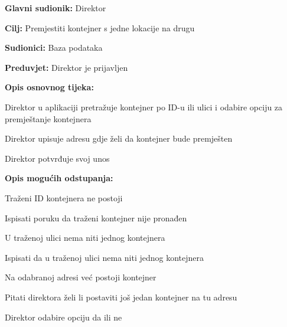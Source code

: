 			\noindent {}
			\begin{packed_item}
				
				\item \textbf{Glavni sudionik: } Direktor
				\item  \textbf{Cilj:} Premjestiti kontejner s jedne lokacije na drugu
				\item  \textbf{Sudionici:} Baza podataka
				\item  \textbf{Preduvjet:} Direktor je prijavljen
				\item  \textbf{Opis osnovnog tijeka:}
				
				\item[] \begin{packed_enum}
					
					\item Direktor u aplikaciji pretražuje kontejner po ID-u ili ulici i odabire opciju za premještanje kontejnera
					\item Direktor upisuje adresu gdje želi da kontejner bude premješten
					\item Direktor potvrđuje svoj unos
				\end{packed_enum}
				
				\item  \textbf{Opis mogućih odstupanja:}
				
				\item[] \begin{packed_item}
					
					\item[2.a] Traženi ID kontejnera ne postoji
					\item[] \begin{packed_enum}
						
						\item Ispisati poruku da traženi kontejner nije pronađen
						
					\end{packed_enum}
					\item[2.b] U traženoj ulici nema niti jednog kontejnera
					\item[] \begin{packed_enum}
						
						\item Ispisati da u traženoj ulici nema niti jednog kontejnera
					\end{packed_enum}
					\item[2.c] Na odabranoj adresi već postoji kontejner
					
					\item[] \begin{packed_enum}
						
						\item Pitati direktora želi li postaviti još jedan kontejner na tu adresu
						\item Direktor odabire opciju da ili ne
						
					\end{packed_enum}
					
					
				\end{packed_item}
			\end{packed_item}
			
